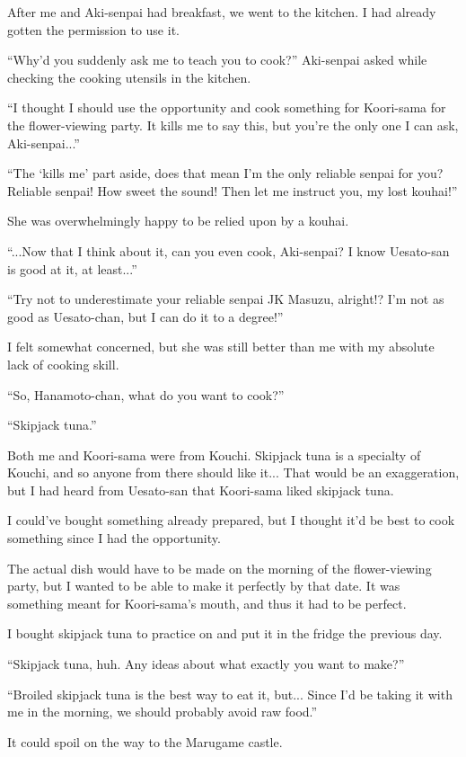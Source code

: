 After me and Aki-senpai had breakfast, we went to the kitchen. I had already gotten the permission to use it.

``Why'd you suddenly ask me to teach you to cook?'' Aki-senpai asked while checking the cooking utensils in the kitchen.

``I thought I should use the opportunity and cook something for Koori-sama for the flower-viewing party. It kills me to say this, but you're the only one I can ask, Aki-senpai...''

``The `kills me' part aside, does that mean I'm the only reliable senpai for you? Reliable senpai! How sweet the sound! Then let me instruct you, my lost kouhai!''

She was overwhelmingly happy to be relied upon by a kouhai.

``...Now that I think about it, can you even cook, Aki-senpai? I know Uesato-san is good at it, at least...''

``Try not to underestimate your reliable senpai JK Masuzu, alright!? I'm not as good as Uesato-chan, but I can do it to a degree!''

I felt somewhat concerned, but she was still better than me with my absolute lack of cooking skill.

``So, Hanamoto-chan, what do you want to cook?''

``Skipjack tuna.''

Both me and Koori-sama were from Kouchi. Skipjack tuna is a specialty of Kouchi, and so anyone from there should like it... That would be an exaggeration, but I had heard from Uesato-san that Koori-sama liked skipjack tuna.

I could've bought something already prepared, but I thought it'd be best to cook something since I had the opportunity.

The actual dish would have to be made on the morning of the flower-viewing party, but I wanted to be able to make it perfectly by that date. It was something meant for Koori-sama's mouth, and thus it had to be perfect.

I bought skipjack tuna to practice on and put it in the fridge the previous day.

``Skipjack tuna, huh. Any ideas about what exactly you want to make?''

``Broiled skipjack tuna is the best way to eat it, but... Since I'd be taking it with me in the morning, we should probably avoid raw food.''

It could spoil on the way to the Marugame castle.

